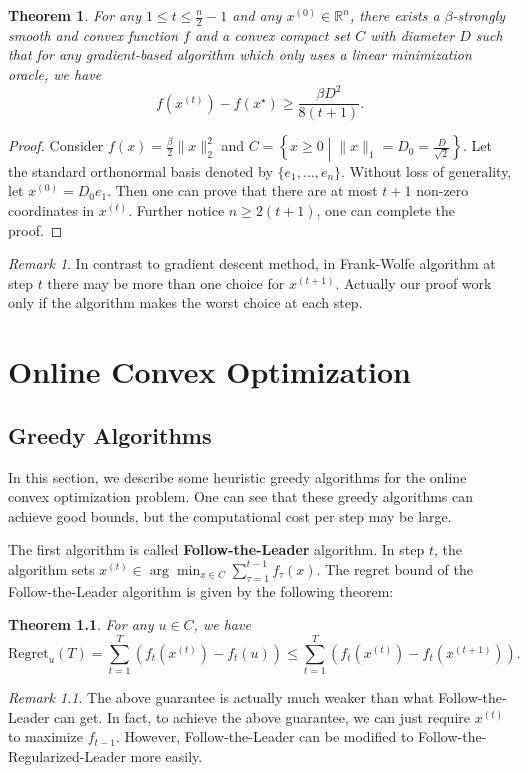 \documentclass[openany]{book}
\newtheorem{theorem}{Theorem}[chapter]
\theoremstyle{definition}
\theoremstyle{remark}
\newtheorem*{remark}{Remark}
\begin{document}
\begin{theorem}
    For any $1\le t\le \frac{n}{2}-1$ and any $x^{(0)}\in \mathbb{R}^n$, there exists a $\beta$-strongly smooth and convex function $f$ and a convex compact set $C$ with diameter $D$ such that for any gradient-based algorithm which only uses a linear minimization oracle, we have
    \begin{equation}
        f(x^{(t)})-f(x^{\star})\ge \frac{\beta D^2}{8(t+1)}.
    \end{equation}
\end{theorem}
\begin{proof}
    Consider $f(x)=\frac{\beta}{2}\|x\|_2^2$ and $C=\left\{x\ge0\middle|\|x\|_1=D_0=\frac{D}{\sqrt{2}}\right\}$. Let the standard orthonormal basis denoted by $\{e_1,\ldots,e_n\}$. Without loss of generality, let $x^{(0)}=D_0e_1$. Then one can prove that there are at most $t+1$ non-zero coordinates in $x^{(t)}$. Further notice $n\ge2(t+1)$, one can complete the proof.
\end{proof}
\begin{remark}
    In contrast to gradient descent method, in Frank-Wolfe algorithm at step $t$ there may be more than one choice for $x^{(t+1)}$. Actually our proof work only if the algorithm makes the worst choice at each step.
\end{remark}

\chapter{Online Convex Optimization}
\section{Greedy Algorithms}
In this section, we describe some heuristic greedy algorithms for the online convex optimization problem. One can see that these greedy algorithms can achieve good bounds, but the computational cost per step may be large.

The first algorithm is called \textbf{Follow-the-Leader} algorithm. In step $t$, the algorithm sets $x^{(t)}\in\arg\min_{x\in C}\sum_{\tau=1}^{t-1}f_{\tau}(x)$. The regret bound of the Follow-the-Leader algorithm is given by the following theorem:
\begin{theorem}\label{followLeadert}
    For any $u\in C$, we have
    \begin{equation}
        \mathrm{Regret}_u(T)=\sum_{t=1}^{T}(f_t(x^{(t)})-f_t(u))\le \sum_{t=1}^{T}(f_t(x^{(t)})-f_t(x^{(t+1)})).
    \end{equation}
\end{theorem}
\begin{remark}
    The above guarantee is actually much weaker than what Follow-the-Leader can get. In fact, to achieve the above guarantee, we can just require $x^{(t)}$ to maximize $f_{t-1}$. However, Follow-the-Leader can be modified to Follow-the-Regularized-Leader more easily.
\end{remark}
\end{document}
